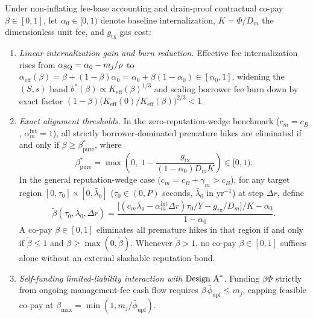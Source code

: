 \begin{theorem}\label{thm:copay}
Under non-inflating fee-base accounting and drain-proof contractual co-pay $\beta \in [0, 1]$, let $\alpha_0 \in [0, 1)$ denote baseline internalization, $K = \Phi/D_m$ the dimensionless unit fee, and $g_{\mathrm{tx}}$ gas cost:
\begin{enumerate}[label=(\roman*), leftmargin=2.2em, itemsep=2pt]
\item \emph{Linear internalization gain and burn reduction.} Effective fee internalization rises from $\alpha_{\mathrm{SQ}} = \alpha_0 - m_j/\rho$ to $\alpha_{\mathrm{eff}}(\beta) = \beta + (1 - \beta)\alpha_0 = \alpha_0 + \beta(1 - \alpha_0) \in [\alpha_0, 1]$, widening the $(S,s)$ band $b^*(\beta) \propto K_{\mathrm{eff}}(\beta)^{1/3}$ and scaling borrower fee burn down by exact factor $(1 - \beta)\bigl(K_{\mathrm{eff}}(0)/K_{\mathrm{eff}}(\beta)\bigr)^{2/3} < 1$.
\item \emph{Exact alignment thresholds.} In the zero-reputation-wedge benchmark ($c_m = c_B$, $\alpha_m^{\mathrm{int}} = 1$), all strictly borrower-dominated premature hikes are eliminated if and only if $\beta \ge \beta^*_{\mathrm{pure}}$, where
\begin{equation}\label{eq:beta_pure}
\beta^*_{\mathrm{pure}} = \max\!\left(0,\; 1 - \frac{g_{\mathrm{tx}}}{(1 - \alpha_0) D_m K}\right) \in [0, 1).
\end{equation}
In the general reputation-wedge case ($c_m = c_B + \gamma_m > c_B$), for any target region $[0, \tau_0] \times [0, \bar{\lambda}_0]$ ($\tau_0 \in (0, P)$ seconds, $\bar{\lambda}_0$ in $\mathrm{yr}^{-1}$) at step $\Delta r$, define
\begin{equation}\label{eq:beta_general}
\tilde{\beta}(\tau_0, \bar{\lambda}_0, \Delta r) = \frac{\bigl[(c_m \bar{\lambda}_0 - \alpha_m^{\mathrm{int}}\Delta r)\tau_0/Y - g_{\mathrm{tx}}/D_m\bigr]/K - \alpha_0}{1 - \alpha_0}.
\end{equation}
A co-pay $\beta \in [0, 1]$ eliminates all premature hikes in that region if and only if $\tilde{\beta} \le 1$ and $\beta \ge \max(0, \tilde{\beta})$. Whenever $\tilde{\beta} > 1$, no co-pay $\beta \in [0, 1]$ suffices alone without an external slashable reputation bond.
\item \emph{Self-funding limited-liability interaction with $\textup{Design A}^*$.} Funding $\beta \Phi$ strictly from ongoing management-fee cash flow requires $\beta\,\bar{\phi}_{\mathrm{upf}} \le m_j$, capping feasible co-pay at $\beta_{\max} = \min(1, m_j/\bar{\phi}_{\mathrm{upf}})$.
\end{enumerate}
\end{theorem}

